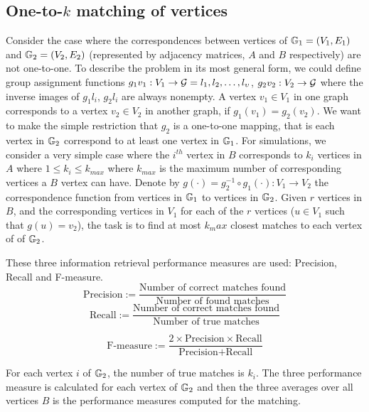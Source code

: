 \documentclass[12pt,oneside,final]{thesis}
\begin{document}
\subsection{One-to-$k$ matching of vertices} 

Consider the case where the correspondences between vertices of $\mathbb{G}_1=(V_1,E_1)$ and $\mathbb{G}_2= (V_2,E_2)$ (represented by adjacency matrices, $A$ and $B$ respectively) are not one-to-one. To describe the problem in its most general form, we could define group assignment functions $g_1{v_1}: V_1 \rightarrow \mathcal{G}={l_1,l_2,\ldots,l_{\upsilon}}$, $g_2{v_2}:V_2 \rightarrow \mathcal{G}$ where the inverse images of $g_1{l_i}$, $g_2{l_i}$ are always nonempty. A vertex $v_1 \in  V_1$ in one graph corresponds to a vertex $v_2 \in  V_2$  in another graph, if $g_1(v_1)=g_2(v_2)$. We want to make the simple restriction that $g_2$ is a one-to-one mapping, that is each vertex in $\mathbb{G}_2$ correspond to at least one vertex in  $\mathbb{G}_1$.
For simulations, we consider a very simple case where the $i^{th}$ vertex in $B$ corresponds to $k_i$ vertices in $A$ where $1\leq k_i \leq k_{max}$ where $k_{max}$ is the maximum number of corresponding vertices a $B$ vertex can have.  Denote by $g(\cdot)=g_2^{-1}\circ g_1(\cdot) : V_1 \rightarrow V_2$ the correspondence function from vertices in $\mathbb{G}_1$ to vertices in $\mathbb{G}_2$. Given $r$ vertices in $B$, and the corresponding vertices in $V_1$ for each of the $r$ vertices ($u \in V_1$ such that $g(u)=v_2$), the task is  to find at most $k_max$ closest matches to each vertex of of $\mathbb{G}_2$. 

These three information retrieval performance measures are used: Precision, Recall and F-measure.
$$\textrm{Precision} :=\frac{\textrm{Number of correct matches found}}{\textrm{Number of found matches}}$$
$$\textrm{Recall}    :=\frac{\textrm{Number of correct matches found}}{\textrm{Number of true matches}}$$

$$\textrm{F-measure}  :=\frac{2 \times \textrm{Precision} \times \textrm{Recall}}{\textrm{Precision} + \textrm{Recall}}$$

For each vertex $i$ of $\mathbb{G}_2$, the number of true matches is $k_i$. The three performance measure is calculated for each vertex of $\mathbb{G}_2$ and then the three averages over all vertices $B$ is the performance measures computed for the  matching.
\end{document}
